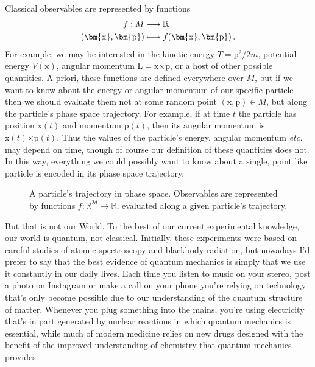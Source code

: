 \documentclass{article}
\theoremstyle{plain}\theoremheaderfont{\normalfont\itshape}\theorembodyfont{\rmfamily}\theoremseparator{.}\newtheorem*{rem}{Remark}\newtheorem*{ex}{Example}\newtheorem*{proof}{Proof}\newtheorem*{altp}{Alternative proof}
\theoremstyle{plain}\theoremheaderfont{\normalfont\bfseries}\theorembodyfont{\rmfamily}\theoremseparator{.}\newtheorem{thm}{Theorem}[section]\newtheorem{lem}[thm]{Lemma}\newtheorem{prop}[thm]{Proposition}\newtheorem*{cor}{Corollary}\newtheorem{defn}[thm]{Definition}\newtheorem{clm}[thm]{Claim}\newtheorem{clminproof}{Claim}
\theoremstyle{break}\theoremheaderfont{\normalfont\itshape}\theorembodyfont{\rmfamily}\theoremseparator{.\medskip}\newtheorem*{proofskip}{Proof}\newtheorem*{exs}{Examples}\newtheorem*{rems}{Remarks}
\theoremstyle{break}\theoremheaderfont{\normalfont\bfseries}\theorembodyfont{\rmfamily}\theoremseparator{.\medskip}\newtheorem{lemskip}[thm]{Lemma}\newtheorem{defnskip}[thm]{Definition}\newtheorem{propskip}[thm]{Proposition}\newtheorem{thmskip}[thm]{Theorem}
\numberwithin{equation}{section}
\newcommand{\vb}[1]{\bm{\mathrm{#1}}}
\newcommand{\cross}{\bm{\times}}
\newcommand{\RR}{\mathbb{R}}
\begin{document}
    Classical observables are represented by functions
    \begin{align}
        f:M&\longrightarrow\RR \notag\\
        (\vb{x},\vb{p})&\longmapsto f(\vb{x},\vb{p})\,.
    \end{align}
    For example, we may be interested in the kinetic energy \(T=\vb{p}^2/2m\), potential energy \(V(\vb{x})\), angular momentum \(\vb{L}=\vb{x}\cross\vb{p}\), or a host of other possible quantities. A priori, these functions are defined everywhere over \(M\), but if we want to know about the energy or angular momentum of our specific particle then we should evaluate them not at some random point \((\vb{x},\vb{p})\in M\), but along the particle's phase space trajectory. For example, if at time \(t\) the particle has position \(\vb{x}(t)\) and momentum \(\vb{p}(t)\), then its angular momentum is \(\vb{x}(t)\cross\vb{p}(t)\). Thus the values of the particle's energy, angular momentum \textit{etc.} may depend on time, though of course our definition of these quantities does not. In this way, everything we could possibly want to know about a single, point like particle is encoded in its phase space trajectory.

    \begin{figure}
        \centering
        \caption{A particle's trajectory in phase space. Observables are represented by functions \(f:\RR^{2d}\to\RR\), evaluated along a given particle's trajectory.}
        \label{Fig:ClassicalTrajectory}
    \end{figure}

    But that is not our World. To the best of our current experimental knowledge, our world is quantum, not classical. Initially, these experiments were based on careful studies of atomic spectroscopy and blackbody radiation, but nowadays I'd prefer to say that the best evidence of quantum mechanics is simply that we use it constantly in our daily lives. Each time you listen to music on your stereo, post a photo on Instagram or make a call on your phone you're relying on technology that's only become possible due to our understanding of the quantum structure of matter. Whenever you plug something into the mains, you're using electricity that's in part generated by nuclear reactions in which quantum mechanics is essential, while much of modern medicine relies on new drugs designed with the benefit of the improved understanding of chemistry that quantum mechanics provides.
\end{document}
